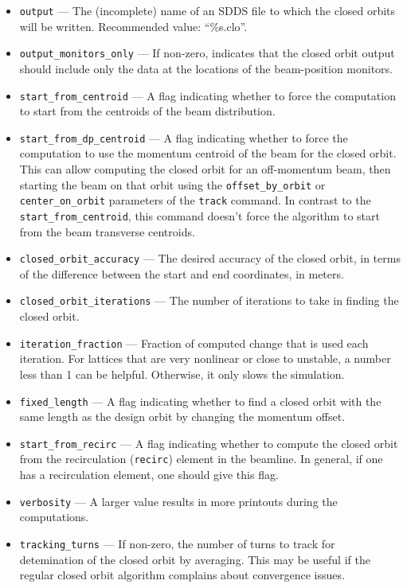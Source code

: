 \documentclass[11pt]{article}
\begin{document}
\begin{itemize}
\item \verb|output| --- The (incomplete) name of an SDDS file to which
the closed orbits will be written.  Recommended value: ``\%s.clo''.
\item \verb|output_monitors_only| --- If non-zero, indicates that the
closed orbit output should include only the data at the locations of
the beam-position monitors.
\item \verb|start_from_centroid| --- A flag indicating whether to
force the computation to start from the centroids of the beam
distribution.
\item \verb|start_from_dp_centroid| --- A flag indicating whether to 
force the computation to use the momentum centroid of the beam 
for the closed orbit.  This can allow computing the closed orbit
for an off-momentum beam, then starting the beam on that orbit
using the \verb|offset_by_orbit| or \verb|center_on_orbit| parameters
of the \verb|track| command.  In contrast to the \verb|start_from_centroid|,
this command doesn't force the algorithm to start from the beam
transverse centroids.
\item \verb|closed_orbit_accuracy| --- The desired accuracy of the
closed orbit, in terms of the difference between the start and end
coordinates, in meters.
\item \verb|closed_orbit_iterations| --- The number of iterations to
take in finding the closed orbit.
\item \verb|iteration_fraction| --- Fraction of computed change that
is used each iteration.  For lattices that are very nonlinear or close
to unstable, a number less than 1 can be helpful.  Otherwise, it only
slows the simulation.
\item \verb|fixed_length| --- A flag indicating whether to find a
closed orbit with the same length as the design orbit by changing the
momentum offset.
\item \verb|start_from_recirc| --- A flag indicating whether to
compute the closed orbit from the recirculation (\verb|recirc|)
element in the beamline.  In general, if one has a recirculation
element, one should give this flag.
\item \verb|verbosity| --- A larger value results in more printouts
during the computations.
\item \verb|tracking_turns| --- If non-zero, the number of turns to track for detemination 
  of the closed orbit by averaging. This may be useful if the regular closed orbit algorithm
  complains about convergence issues.
\end{itemize}
\end{document}
